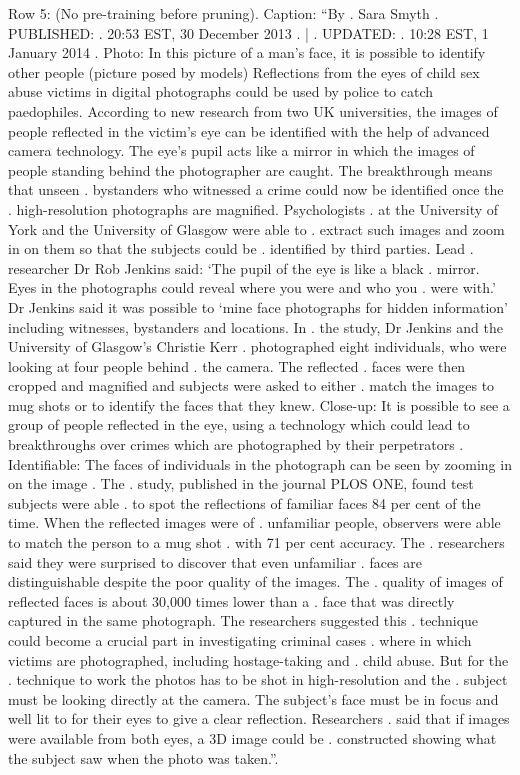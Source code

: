 \begin{table}[H]
\centering
\caption{Row 5: (No pre-training before pruning). \ifshowcaption{}Caption: ``By . Sara Smyth . PUBLISHED: . 20:53 EST, 30 December 2013 . | . UPDATED: . 10:28 EST, 1 January 2014 . Photo: In this picture of a man's face, it is possible to identify other people (picture posed by models) Reflections from the eyes of child sex abuse victims in digital photographs could be used by police to catch paedophiles. According to new research from two UK universities, the images of people reflected in the victim's eye can be identified with the help of advanced camera technology. The eye's pupil acts like a mirror in which the images of people standing behind the photographer are caught. The breakthrough means that unseen . bystanders who witnessed a crime could now be identified once the . high-resolution photographs are magnified. Psychologists . at the University of York and the University of Glasgow were able to . extract such images and zoom in on them so that the subjects could be . identified by third parties. Lead . researcher Dr Rob Jenkins said: ‘The pupil of the eye is like a black . mirror. Eyes in the photographs could reveal where you were and who you . were with.' Dr Jenkins said it was possible to ‘mine face photographs for hidden information' including witnesses, bystanders and locations. In . the study, Dr Jenkins and the University of Glasgow's Christie Kerr . photographed eight individuals, who were looking at four people behind . the camera. The reflected . faces were then cropped and magnified and subjects were asked to either . match the images to mug shots or to identify the faces that they knew. Close-up: It is possible to see a group of people reflected in the eye, using a technology which could lead to breakthroughs over crimes which are photographed by their perpetrators . Identifiable: The faces of individuals in the photograph can be seen by zooming in on the image . The . study, published in the journal PLOS ONE, found test subjects were able . to spot the reflections of familiar faces 84 per cent of the time. When the reflected images were of . unfamiliar people, observers were able to match the person to a mug shot . with 71 per cent accuracy. The . researchers said they were surprised to discover that even unfamiliar . faces are distinguishable despite the poor quality of the images. The . quality of images of reflected faces is about 30,000 times lower than a . face that was directly captured in the same photograph. The researchers suggested this . technique could become a crucial part in investigating criminal cases . where in which victims are photographed, including hostage-taking and . child abuse. But for the . technique to work the photos has to be shot in high-resolution and the . subject must be looking directly at the camera. The subject's face must be in focus and well lit to for their eyes to give a clear reflection. Researchers . said that if images were available from both eyes, a 3D image could be . constructed showing what the subject saw when the photo was taken.''.\fi}

\end{table}
